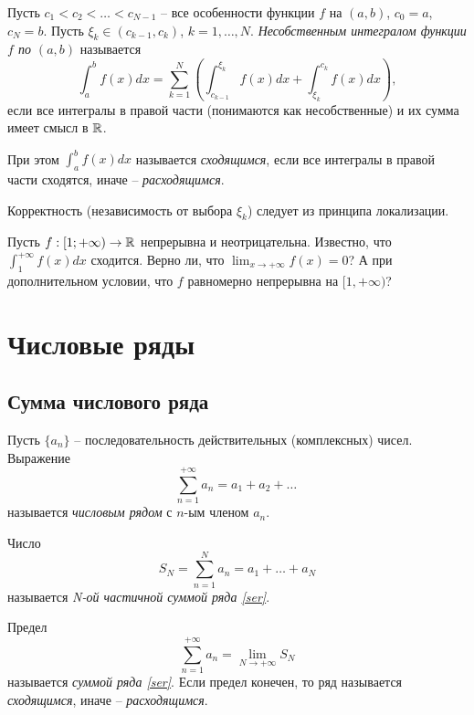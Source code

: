 
\begin{definition}
    Пусть $c_{1} < c_{2} < \ldots < c_{N-1}$ -- все особенности функции $f$ на $(a, b)$, $c_{0} = a$, $c_{N} = b$. Пусть $\xi_{k} \in (c_{k-1}, c_{k})$, $k = 1, \ldots , N$. \textit{Несобственным интегралом функции $f$ по $(a, b)$} называется
    \[\int_{a}^{b}f(x)dx = \sum_{k = 1}^{N}\left( \int_{c_{k-1}}^{\xi_{k}}f(x)dx + \int_{\xi_{k}}^{c_{k}}f(x)dx \right),\]
    если все интегралы в правой части (понимаются как несобственные) и их сумма имеет смысл в $\mathbb{R}$.
    
    При этом $\int_{a}^{b}f(x)dx$ называется \textit{сходящимся}, если все интегралы в правой части сходятся, иначе -- \textit{расходящимся}.
\end{definition}

\begin{note}
    Корректность (независимость от выбора $\xi_{k}$) следует из принципа локализации.
\end{note}

\begin{problem}
    Пусть $f: [1; +\infty) \to \mathbb{R}$ непрерывна и неотрицательна. Известно, что $\int_{1}^{+\infty} f(x)dx$ сходится. Верно ли, что $\lim_{x \to +\infty} f(x) = 0$? А при дополнительном условии, что $f$ равномерно непрерывна на $[1, +\infty)$?
\end{problem}

\section{Числовые ряды}

\subsection{Сумма числового ряда}

\begin{definition}
    Пусть $\{a_{n}\}$ -- последовательность действительных (комплексных) чисел. Выражение
    \[\sum_{n = 1}^{+\infty}a_{n} = a_1 + a_2 + \ldots \ \label{ser}\]
    называется \textit{числовым рядом} с $n$-ым членом $a_{n}$.
    
    Число 
    \[S_{N} = \sum_{n = 1}^{N} a_{n} = a_1 + \ldots + a_{N}\]
    называется \textit{N-ой частичной суммой ряда \ref{ser}}.
    
    Предел
    \[\sum_{n = 1}^{+\infty} a_{n} = \lim_{N \to +\infty} S_{N}\]
    называется \textit{суммой ряда \ref{ser}}. Если предел конечен, то ряд называется \textit{сходящимся}, иначе -- \textit{расходящимся}.
\end{definition}

